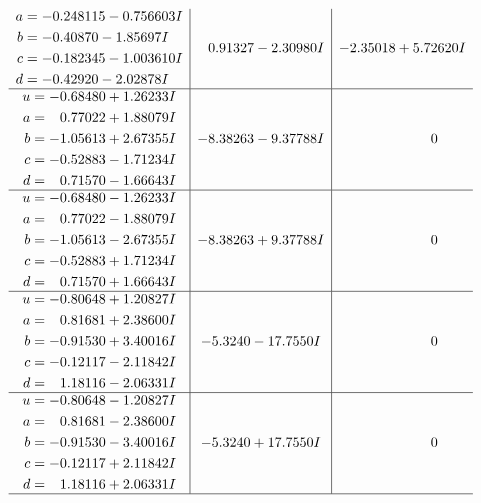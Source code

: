 \documentclass[1p]{elsarticle_modified}
\theoremstyle{definition}
\begin{document}
$$\begin{array}{c|c|c}
\begin{aligned}
a &= -0.248115 - 0.756603 I \\
b &= -0.40870 - 1.85697 I \\
c &= -0.182345 - 1.003610 I \\
d &= -0.42920 - 2.02878 I\end{aligned}
 & \phantom{-}0.91327 - 2.30980 I & -2.35018 + 5.72620 I \\ \hline\begin{aligned}
u &= -0.68480 + 1.26233 I \\
a &= \phantom{-}0.77022 + 1.88079 I \\
b &= -1.05613 + 2.67355 I \\
c &= -0.52883 - 1.71234 I \\
d &= \phantom{-}0.71570 - 1.66643 I\end{aligned}
 & -8.38263 - 9.37788 I & \phantom{-0.000000 } 0 \\ \hline\begin{aligned}
u &= -0.68480 - 1.26233 I \\
a &= \phantom{-}0.77022 - 1.88079 I \\
b &= -1.05613 - 2.67355 I \\
c &= -0.52883 + 1.71234 I \\
d &= \phantom{-}0.71570 + 1.66643 I\end{aligned}
 & -8.38263 + 9.37788 I & \phantom{-0.000000 } 0 \\ \hline\begin{aligned}
u &= -0.80648 + 1.20827 I \\
a &= \phantom{-}0.81681 + 2.38600 I \\
b &= -0.91530 + 3.40016 I \\
c &= -0.12117 - 2.11842 I \\
d &= \phantom{-}1.18116 - 2.06331 I\end{aligned}
 & -5.3240 - 17.7550 I & \phantom{-0.000000 } 0 \\ \hline\begin{aligned}
u &= -0.80648 - 1.20827 I \\
a &= \phantom{-}0.81681 - 2.38600 I \\
b &= -0.91530 - 3.40016 I \\
c &= -0.12117 + 2.11842 I \\
d &= \phantom{-}1.18116 + 2.06331 I\end{aligned}
 & -5.3240 + 17.7550 I & \phantom{-0.000000 } 0\\
 \hline 
 \end{array}$$\newpage$$\begin{array}{c|c|c}  

\end{array}$$
\end{document}
